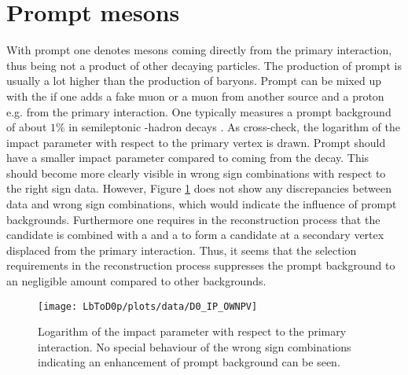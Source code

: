 \section{Prompt \Dz mesons}
With prompt \Dz one denotes \Dz mesons coming directly from the primary \proton\proton interaction, thus being not a product of other decaying particles.
The production of prompt \Dz is usually a lot higher than the production of \Lb baryons. 
Prompt \Dz can be mixed up with the \LbToDpmunuX if one adds a fake muon or a muon from another source and a proton e.g. from the primary interaction.
One typically measures a prompt \Dz background of about $1\%$ in semileptonic \bquark-hadron decays \cite{asld_LHCb}.
As cross-check, the logarithm of the \Dz impact parameter with respect to the primary vertex is drawn.
Prompt \Dz should have a smaller impact parameter compared to \Dz coming from the \Lb decay.
This should become more clearly visible in wrong sign combinations with respect to the right sign data.
However, Figure \ref{fig:plot_D0_IP} does not show any discrepancies between data and wrong sign combinations, which would indicate the influence of prompt \Dz backgrounds.
Furthermore one requires in the reconstruction process that the \Dz candidate is combined with a \mun and a \proton to form a \Lb candidate at a secondary vertex displaced from the primary interaction.
Thus, it seems that the selection requirements in the reconstruction process suppresses the prompt \Dz background to an negligible amount compared to other backgrounds. 
\begin{figure}[tb]
	\centering
	\texttt{[image: LbToD0p/plots/data/D0\_IP\_OWNPV]}
	\caption{Logarithm of the \Dz impact parameter with respect to the primary \proton\proton interaction. No special behaviour of the wrong sign combinations indicating an enhancement of prompt \Dz background can be seen.}
	\label{fig:plot_D0_IP}
\end{figure}


